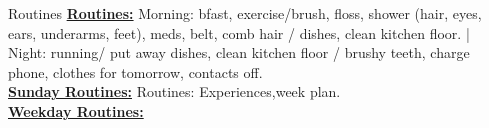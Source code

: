 \documentclass[serif, mathserif, final]{beamer}
\begin{document}
\begin{frame}
  \begin{columns}
    \begin{column}{0.25\linewidth} %

      \begin{block}{Routines}
      \textbf{\underline{Routines:}} Morning: bfast, exercise/brush,
      floss, shower (hair, eyes, ears, underarms, feet), meds, belt,
      comb hair / dishes, clean kitchen floor. |  Night: running/ put
      away dishes, clean kitchen floor / brushy teeth, charge phone,
      clothes for tomorrow, contacts off. \\ 

      \textbf{\underline{Sunday Routines:}} Routines: Experiences,week plan. \\ 
      \textbf{\underline{ Weekday Routines: } } 

      \end{block} 


\end{column}
\end{columns}
\end{frame}
\end{document}
